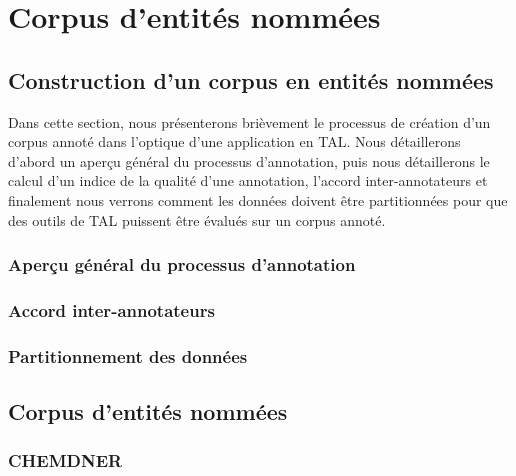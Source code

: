 \documentclass[12pt,a4paper,times,twoside,openright]{report}
\begin{document}
\chapter{Corpus d'entités nommées}
\label{chap:NER-corpus}
\minitoc

    
    \section{Construction d'un corpus en entités nommées}
    \label{sec:ne-corpus-constitution}
    
    Dans cette section, nous présenterons brièvement le processus de création d'un corpus annoté dans l'optique d'une application en TAL. Nous détaillerons d'abord un aperçu général du processus d'annotation, puis nous détaillerons le calcul d'un indice de la qualité d'une annotation, l'accord inter-annotateurs et finalement nous verrons comment les données doivent être partitionnées pour que des outils de TAL puissent être évalués sur un corpus annoté.
    
        \subsection{Aperçu général du processus d'annotation}
        \label{subsec:corpora-overview}
        
    
        \subsection{Accord inter-annotateurs}
        \label{subsec:inter-annotator-agreement}
        
        
        \subsection{Partitionnement des données}
        \label{subsec:data-partition}
        
    
    \section{Corpus d'entités nommées}
    \label{sec:named-entity-corpora}
    
        \subsection{CHEMDNER}
        \label{subsec:corpus-CHEMDNER}
        
        
\end{document}
